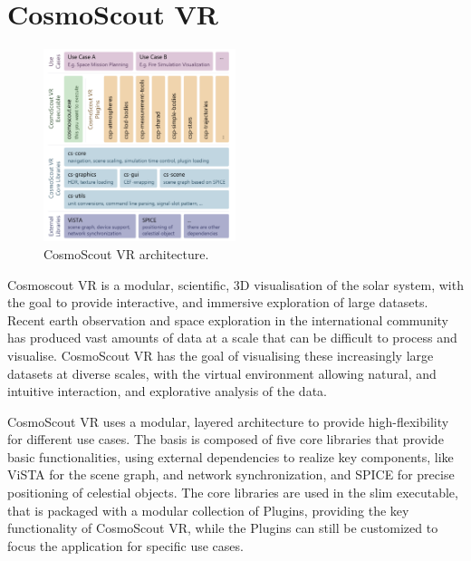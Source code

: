 \section{CosmoScout VR}\label{sec:cosmoscout-vr}

\begin{figure}
    \centering
    \includegraphics[width=0.5\textwidth]{content/2_3_cosmoscout/img/cosmoscout-architecture}
    \caption{CosmoScout VR architecture.}
    \label{fig:cosmoscout-architecture}
\end{figure}

Cosmoscout VR is a modular, scientific, 3D visualisation of the solar system, with the goal to provide interactive,
and immersive exploration of large datasets.
Recent earth observation and space exploration in the international community has produced vast amounts of data at a
scale that can be difficult to process and visualise.
CosmoScout VR has the goal of visualising these increasingly large datasets at diverse scales, with the virtual
environment allowing natural, and intuitive interaction, and explorative analysis of the data.

CosmoScout VR uses a modular, layered architecture to provide high-flexibility for different use cases.
The basis is composed of five core libraries that provide basic functionalities, using external dependencies to
realize key components, like ViSTA for the scene graph, and network synchronization, and SPICE for precise positioning
of celestial objects.
The core libraries are used in the slim executable, that is packaged with a modular collection of Plugins, providing
the key functionality of CosmoScout VR, while the Plugins can still be customized to focus the application for
specific use cases.
